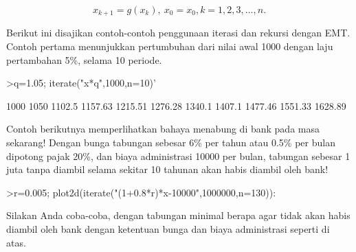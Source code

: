 \documentclass[a4paper,10pt]{article}
\begin{document}
\begin{eulernotebook}
\begin{eulercomment}
\begin{eulercomment}
\begin{eulercomment}
\begin{eulercomment}
\begin{eulercomment}
\end{eulercomment}
\begin{eulerformula}
\[
x_{k+1}=g(x_k), \ x_0=x_0, k= 1, 2, 3, ..., n.
\]
\end{eulerformula}
\begin{eulercomment}
Berikut ini disajikan contoh-contoh penggunaan iterasi dan rekursi dengan EMT. Contoh
pertama menunjukkan pertumbuhan dari nilai awal 1000 dengan laju pertambahan 5\%, selama 10
periode.
\end{eulercomment}
\begin{eulerprompt}
>q=1.05; iterate("x*q",1000,n=10)'
\end{eulerprompt}
\begin{euleroutput}
           1000 
           1050 
         1102.5 
        1157.63 
        1215.51 
        1276.28 
         1340.1 
         1407.1 
        1477.46 
        1551.33 
        1628.89 
\end{euleroutput}
\begin{eulercomment}
Contoh berikutnya memperlihatkan bahaya menabung di bank pada masa sekarang! Dengan bunga
tabungan sebesar 6\% per tahun atau 0.5\% per bulan dipotong pajak 20\%, dan biaya administrasi
10000 per bulan, tabungan sebesar 1 juta tanpa diambil selama sekitar 10 tahunan akan habis
diambil oleh bank!
\end{eulercomment}
\begin{eulerprompt}
>r=0.005; plot2d(iterate("(1+0.8*r)*x-10000",1000000,n=130)):
\end{eulerprompt}
\begin{eulercomment}
Silakan Anda coba-coba, dengan tabungan minimal berapa agar tidak akan habis diambil oleh
bank dengan ketentuan bunga dan biaya administrasi seperti di atas.


\end{eulercomment}
\end{eulercomment}
\end{eulercomment}
\end{eulercomment}
\end{eulercomment}
\end{eulernotebook}
\end{document}
